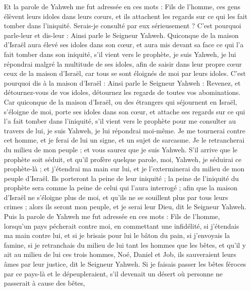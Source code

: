 \begin{multicols}{2}
Et la parole de Yahweh me fut adressée en ces mots :
Fils de l’homme, ces gens élèvent leurs idoles dans leurs cœurs, et ils attachent les regards sur ce qui les fait tomber dans l’iniquité. Serais-je consulté par eux sérieusement ?
C'est pourquoi parle-leur et dis-leur : Ainsi parle le Seigneur Yahweh. Quiconque de la maison d'Israël aura élevé ses idoles dans son cœur, et aura mis devant sa face ce qui l’a fait tomber dans son iniquité, s’il  vient vers le prophète, je suis Yahweh, je lui répondrai malgré la multitude de ses idoles,
afin de saisir dans leur propre cœur ceux de la maison d'Israël, car tous se sont éloignés de moi par leurs idoles.
C'est pourquoi dis à la maison d'Israël : Ainsi parle le Seigneur Yahweh : Revenez, et détournez-vous de vos idoles, détournez les regards de toutes vos abominations.
Car quiconque de la maison d'Israël, ou des étrangers qui séjournent en Israël, s’éloigne de moi, porte ses idoles dans son cœur, et attache ses regards sur ce qui l’a fait tomber dans l’iniquité, s'il vient vers le prophète pour me consulter au travers de lui, je suis Yahweh, je lui répondrai moi-même.
Je me tournerai contre cet homme, et je ferai de lui un signe, et un sujet de sarcasme. Je le retrancherai du milieu de mon peuple ; et vous saurez que je suis Yahweh.
S'il arrive que le prophète soit séduit, et qu'il profère quelque parole, moi, Yahweh, je séduirai ce prophète-là ; et j'étendrai ma main sur lui, et je l'exterminerai du milieu de mon peuple d'Israël.
Ils porteront la peine de leur iniquité ; la peine de l'iniquité du prophète sera comme la peine de celui qui l'aura interrogé ;
afin que la maison d'Israël ne s'éloigne plus de moi, et qu'ils ne se souillent plus par tous leurs crimes ; alors ils seront mon peuple, et je serai leur Dieu, dit le Seigneur Yahweh.
Puis la parole de Yahweh me fut adressée en ces mots :
Fils de l’homme, lorsqu'un pays pécherait contre moi, en commettant une infidélité, si j’étendais ma main contre lui, et si je brisais pour lui le bâton du pain, si j’envoyais la famine, si je retranchais du milieu de lui tant les hommes que les bêtes,
et qu’il y ait au milieu de lui ces trois hommes, Noé, Daniel et Job, ils sauveraient leurs âmes par leur justice, dit le Seigneur Yahweh.
Si je faisais passer les bêtes féroces par ce pays-là et le dépeupleraient, s’il devenait un désert où personne ne passerait à cause des bêtes,

\end{multicols}
